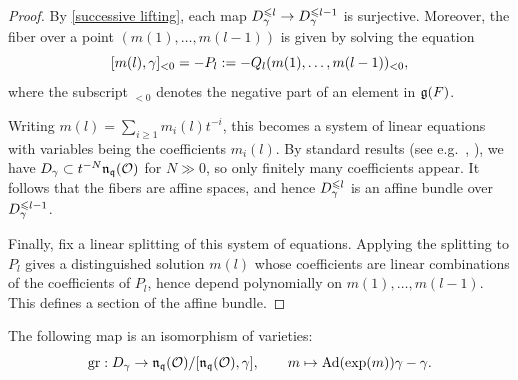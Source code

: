 \documentclass[11pt]{article}
\numberwithin{equation}{section}
\begin{document}
\begin{proof}
By \cref{successive lifting}, each map
$D_\gamma^{\leqslant l}\to D_\gamma^{\leqslant l-1}$ is surjective.
Moreover, the fiber over a point $(m(1),\dots,m(l-1))$
is given by solving the equation
\[
[m(l),\gamma]_{<0} = -P_l
:= -Q_l(m(1),\dots,m(l-1))_{<0},
\]
where the subscript $_{<0}$ denotes the negative part
of an element in $\mathfrak{g}(F)$. 

Writing $m(l)=\sum_{i\ge 1} m_i(l)t^{-i}$, this becomes a system of linear equations with variables being the coefficients $m_i(l)$. By standard results (see e.g.\ \cite{KL88}, \cite{YunPCMI}),
we have $D_\gamma \subset t^{-N}\mathfrak{n}_{\mathfrak{q}}(\mathcal{O})$ for $N\gg 0$,
so only finitely many coefficients appear.
It follows that the fibers are affine spaces, and hence
$D_\gamma^{\leqslant l}$ is an affine bundle over $D_\gamma^{\leqslant l-1}$.

Finally, fix a linear splitting of this system of equations. Applying the
splitting to $P_l$ gives a distinguished solution $m(l)$ whose coefficients are linear combinations of the coefficients of $P_l$, hence
depend polynomially on $m(1),\dots,m(l-1)$. This defines a section of the
affine bundle.
\end{proof}

\begin{pro} \label{isom to quotient vs}
The following map is an isomorphism of varieties:
\[
\operatorname{gr}: D_\gamma \to \mathfrak{n}_{\mathfrak{q}}(\mathcal{O})/[\mathfrak{n}_{\mathfrak{q}}(\mathcal{O}),\gamma],
\qquad
m \mapsto \operatorname{Ad}(\exp(m))\gamma-\gamma.
\]
\end{pro}
\end{document}
